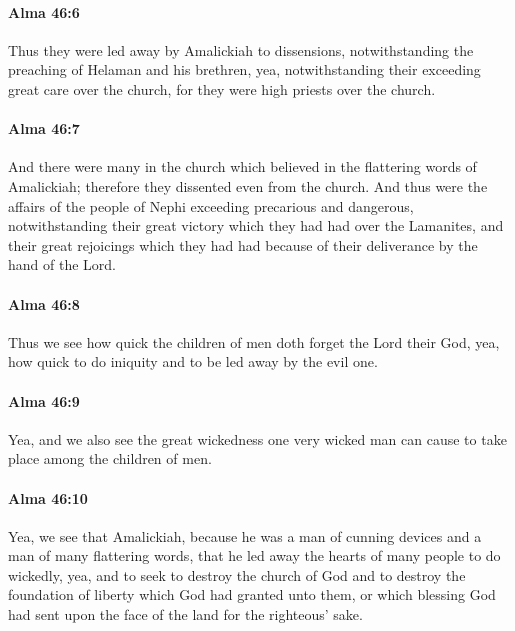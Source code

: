 		\paragraph{Alma 46:6} %
			\label{ALMA-46-6}

			Thus they were led away by Amalickiah to dissensions,
			notwithstanding the preaching of Helaman and his brethren,
			yea, notwithstanding their exceeding great care over the church,
			for they were high priests over the church.

		\paragraph{Alma 46:7} %
			\label{ALMA-46-7}

			And there were many in the church
			which believed in the flattering words of Amalickiah;
			therefore they dissented even from the church.
			And thus were the affairs of the people of Nephi
			exceeding precarious and dangerous,
			notwithstanding their great victory which they had had over the Lamanites,
			and their great rejoicings which they had had
			because of their deliverance by the hand of the Lord.

		\paragraph{Alma 46:8} %
			\label{ALMA-46-8}

			Thus we see how quick the children of men doth forget the Lord their God,
			yea, how quick to do iniquity and to be led away by the evil one.

		\paragraph{Alma 46:9} %
			\label{ALMA-46-9}

			Yea, and we also see the great wickedness
			one very wicked man can cause to take place among the children of men.

		\paragraph{Alma 46:10} %
			\label{ALMA-46-10}

			Yea, we see that Amalickiah,
			because he was a man of cunning devices and a man of many flattering words,
			that he led away the hearts of many people to do wickedly,
			yea, and to seek to destroy the church of God
			and to destroy the foundation of liberty
			which God had granted unto them,
			or which blessing God had sent upon the face of the land
			for the righteous' sake.


